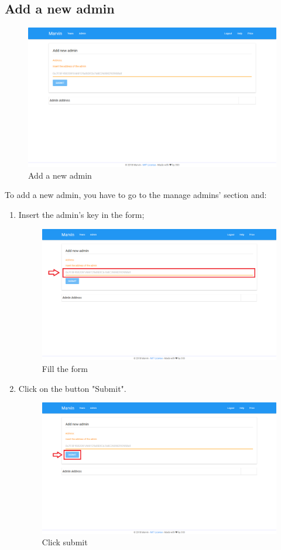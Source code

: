 \documentclass[ManualeUtente]{subfiles}
\begin{document}
\subsection{Add a new admin}
\begin{figure}[H]
	\centering
	\includegraphics[width=0.7\linewidth]{image/UniversityAddAmin}
	\caption[Add admin]{Add a new admin}
	\label{fig:universityaddamin}
\end{figure}
To add a new admin, you have to go to the manage admins' section and:
\begin{enumerate}
	\item Insert the admin's key in the form;
	\begin{figure}[H]
		\centering
		\includegraphics[width=0.7\linewidth]{image/UniversityAddAmin1}
		\caption[Add admin form]{Fill the form}
		\label{fig:universityaddamin}
	\end{figure}
	\item Click on the button "Submit".
	\begin{figure}[H]
		\centering
		\includegraphics[width=0.7\linewidth]{image/UniversityAddAmin2}
		\caption[Add admin submit]{Click submit}
		\label{fig:universityaddamin}
	\end{figure}
\end{enumerate}
\end{document}
